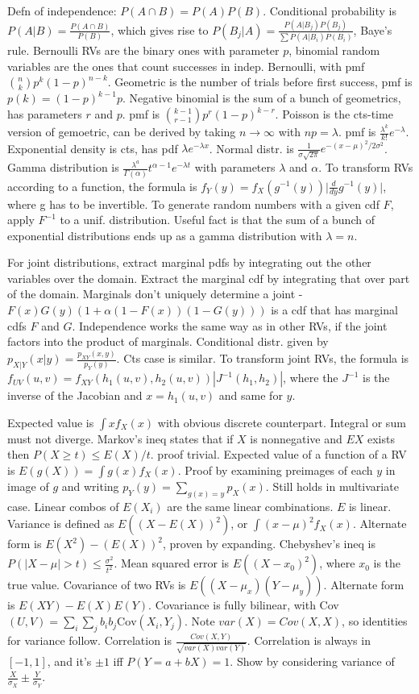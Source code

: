 \documentclass{article}
\begin{document}
\small
Defn of independence: $P(A\cap B)=P(A)P(B)$. Conditional probability is $P(A|B)=\frac{P(A\cap B)}{P(B)}$, which gives rise to $P(B_j|A)=\frac{P(A|B_j)P(B_j)}{\sum P(A|B_i)P(B_i)}$, Baye's rule. Bernoulli RVs are the binary ones with parameter $p$, binomial random variables are the ones that count successes in indep. Bernoulli, with pmf $\binom{n}{k}p^k(1-p)^{n-k}$. Geometric is the number of trials before first success, pmf is $p(k)=(1-p)^{k-1}p$. Negative binomial is the sum of a bunch of geometrics, has parameters $r$ and $p$. pmf is $\binom{k-1}{r-1}p^r(1-p)^{k-r}$. 
Poisson is the cts-time version of gemoetric, can be derived by taking $n\to\infty$ with $np=\lambda$. pmf is $\frac{\lambda^k}{k!}e^{-\lambda}$. Exponential density is cts, has pdf $\lambda e^{-\lambda x}$. Normal distr. is $\frac{1}{\sigma\sqrt{2\pi}}e^{-(x-\mu)^2/2\sigma^2}$. Gamma distribution is $\frac{\lambda^a}{\Gamma(\alpha)}t^{\alpha-1}e^{-\lambda t}$ with parameters $\lambda$ and $\alpha$. To transform RVs according to a function, the formula is $f_Y(y)=f_X(g^{-1}(y))\big|\frac{d}{dy}g^{-1}(y)\big|$, where g has to be invertible. To generate random numbers with a given cdf $F$, apply $F^{-1}$ to a unif. distribution. Useful fact is that the sum of a bunch of exponential distributions ends up as a gamma distribution with $\lambda=n$.

For joint distributions, extract marginal pdfs by integrating out the other variables over the domain. Extract the marginal cdf by integrating that over part of the domain. Marginals don't uniquely determine a joint - $F(x)G(y)(1+\alpha(1-F(x))(1-G(y)))$ is a cdf that has marginal cdfs $F$ and $G$. 
Independence works the same way as in other RVs, if the joint factors into the product of marginals. Conditional distr. given by $p_{X|Y}(x|y)=\frac{p_{XY}(x,y)}{p_Y(y)}$. Cts case is similar. To transform joint RVs, the formula is $f_{UV}(u,v)=f_{XY}(h_1(u,v),h_2(u,v))|J^{-1}(h_1,h_2)|$, where the $J^{-1}$ is the inverse of the Jacobian and $x=h_1(u,v)$ and same for $y$. 

Expected value is $\int xf_X(x)$ with obvious discrete counterpart. Integral or sum must not diverge. Markov's ineq states that if $X$ is nonnegative and $EX$ exists then $P(X\geq t)\leq E(X)/t$. proof trivial. Expected value of a function of a RV is $E(g(X))=\int g(x)f_X(x)$. Proof by examining preimages of each $y$ in image of $g$ and writing $p_Y(y)=\sum_{g(x)=y}p_X(x)$. Still holds in multivariate case. Linear combos of $E(X_i)$ 
are the same linear combinations. $E$ is linear. Variance is defined as $E((X-E(X))^2)$, or $\int(x-\mu)^2f_X(x)$. Alternate form is $E(X^2)-(E(X))^2$, proven by expanding. Chebyshev's ineq is $P(|X-\mu|>t)\leq\frac{\sigma^2}{t^2}$. Mean squared error is $E((X-x_0)^2)$, where $x_0$ is the true value. Covariance of two RVs is $E((X-\mu_x)(Y-\mu_y))$. Alternate form is $E(XY)-E(X)E(Y)$. 
Covariance is fully bilinear, with Cov$(U,V)=\sum_i\sum_jb_ib_j\text{Cov}(X_i,Y_j)$. Note $var(X)=Cov(X,X)$, so identities for variance follow. Correlation is $\frac{Cov(X,Y)}{\sqrt{var(X)var(Y)}}$. Correlation is always in $[-1,1]$, and it's $\pm1$ iff $P(Y=a+bX)=1$. Show by considering variance of $\frac{X}{\sigma_X}\pm\frac{Y}{\sigma_Y}$.
\end{document}

